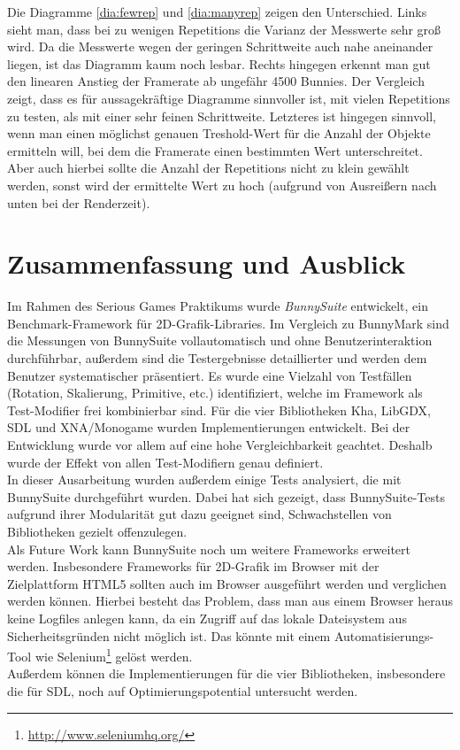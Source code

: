 Die Diagramme \ref{dia:fewrep} und \ref{dia:manyrep} zeigen den Unterschied. Links sieht man, dass bei zu wenigen Repetitions die Varianz der Messwerte sehr groß wird. Da die Messwerte wegen der geringen Schrittweite auch nahe aneinander liegen, ist das Diagramm kaum noch lesbar. Rechts hingegen erkennt man gut den linearen Anstieg der Framerate ab ungefähr 4500 Bunnies. Der Vergleich zeigt, dass es für aussagekräftige Diagramme sinnvoller ist, mit vielen Repetitions zu testen, als mit einer sehr feinen Schrittweite. Letzteres ist hingegen sinnvoll, wenn man einen möglichst genauen Treshold-Wert für die Anzahl der Objekte ermitteln will, bei dem die Framerate einen bestimmten Wert unterschreitet. Aber auch hierbei sollte die Anzahl der Repetitions nicht zu klein gewählt werden, sonst wird der ermittelte Wert zu hoch (aufgrund von Ausreißern nach unten bei der Renderzeit).

\chapter{Zusammenfassung und Ausblick}
Im Rahmen des Serious Games Praktikums wurde \textit{BunnySuite} entwickelt, ein Benchmark-Framework für 2D-Grafik-Libraries. Im Vergleich zu BunnyMark sind die Messungen von BunnySuite vollautomatisch und ohne Benutzerinteraktion durchführbar, außerdem sind die Testergebnisse detaillierter und werden dem Benutzer systematischer präsentiert. Es wurde eine Vielzahl von Testfällen (Rotation, Skalierung, Primitive, etc.) identifiziert, welche im Framework als Test-Modifier frei kombinierbar sind. Für die vier Bibliotheken Kha, LibGDX, SDL und XNA/Monogame wurden Implementierungen entwickelt. Bei der Entwicklung wurde vor allem auf eine hohe Vergleichbarkeit geachtet. Deshalb wurde der Effekt von allen Test-Modifiern genau definiert.\\
In dieser Ausarbeitung wurden außerdem einige Tests analysiert, die mit BunnySuite durchgeführt wurden. Dabei hat sich gezeigt, dass BunnySuite-Tests aufgrund ihrer Modularität gut dazu geeignet sind, Schwachstellen von Bibliotheken gezielt offenzulegen. 
\\
Als Future Work kann BunnySuite noch um weitere Frameworks erweitert werden. Insbesondere Frameworks für 2D-Grafik im Browser mit der Zielplattform HTML5 sollten auch im Browser ausgeführt werden und verglichen werden können. Hierbei besteht das Problem, dass man aus einem Browser heraus keine Logfiles anlegen kann, da ein Zugriff auf das lokale Dateisystem aus Sicherheitsgründen nicht möglich ist. Das könnte mit einem Automatisierungs-Tool wie Selenium\footnote{\url{http://www.seleniumhq.org/}} gelöst werden.\\
Außerdem können die Implementierungen für die vier Bibliotheken, insbesondere die für SDL, noch auf Optimierungspotential untersucht werden.
